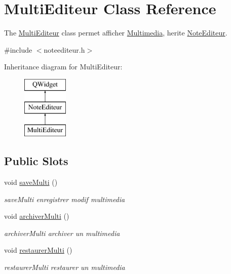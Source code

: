 \hypertarget{class_multi_editeur}{}\section{Multi\+Editeur Class Reference}
\label{class_multi_editeur}


The \hyperlink{class_multi_editeur}{Multi\+Editeur} class permet afficher \hyperlink{class_multimedia}{Multimedia}, herite \hyperlink{class_note_editeur}{Note\+Editeur}.  




{\ttfamily \#include $<$noteediteur.\+h$>$}

Inheritance diagram for Multi\+Editeur\+:\begin{figure}[H]
\begin{center}
\leavevmode
\includegraphics[height=3.000000cm]{class_multi_editeur}
\end{center}
\end{figure}
\subsection*{Public Slots}
\begin{DoxyCompactItemize}
\item 
\mbox{\label{class_multi_editeur_a70904cb42da2463fdcd124fe42e47a68}} 
void \hyperlink{class_multi_editeur_a70904cb42da2463fdcd124fe42e47a68}{save\+Multi} ()
\begin{DoxyCompactList}\small\item\em save\+Multi enregistrer modif multimedia \end{DoxyCompactList}\item 
\mbox{\label{class_multi_editeur_ade11724d5637738f716e913bfb707511}} 
void \hyperlink{class_multi_editeur_ade11724d5637738f716e913bfb707511}{archiver\+Multi} ()
\begin{DoxyCompactList}\small\item\em archiver\+Multi archiver un multimedia \end{DoxyCompactList}\item 
\mbox{\label{class_multi_editeur_a201417424a9d8fac2828daa6b78388c3}} 
void \hyperlink{class_multi_editeur_a201417424a9d8fac2828daa6b78388c3}{restaurer\+Multi} ()
\begin{DoxyCompactList}\small\item\em restaurer\+Multi restaurer un multimedia \end{DoxyCompactList}\end{DoxyCompactItemize}
